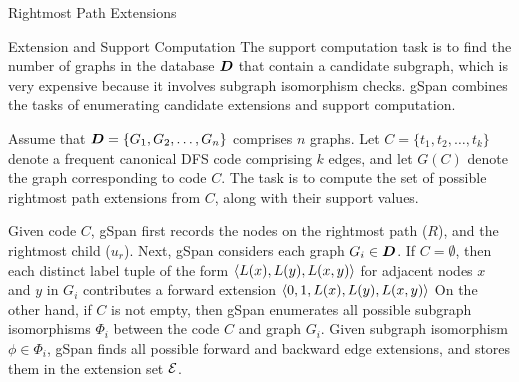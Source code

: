 \begin{frame}[fragile]{Rightmost Path Extensions}
\begin{figure}
  \centerline{
  }
\end{figure}
\end{frame}


\begin{frame}{Extension and Support Computation}
The support computation task is
to f\/{i}nd the number of graphs in the
database ${\boldsymbol D}$ that contain a candidate subgraph, which is very
expensive because it involves subgraph isomorphism checks.
gSpan combines the tasks of enumerating candidate extensions and support
computation.

\medskip
Assume that ${\boldsymbol D} = \{G_1, G_2, \ldots, G_n\}$ comprises $n$
graphs.  Let $C=\{t_1,t_2,\ldots,t_k\}$ denote a frequent
canonical DFS code comprising $k$ edges, and let $G(C)$ denote the
graph corresponding to code $C$.  The task is to compute the set
of possible rightmost path extensions from $C$, along with their
support values.

\medskip
Given code $C$, gSpan f\/{i}rst records the nodes on the rightmost path
($R$), and the rightmost child ($u_r$).  Next, gSpan considers each
graph $G_i \in {\boldsymbol D}$. If $C=\emptyset$, then each distinct label tuple of
the form $\langle L(x), L(y), L(x,y) \rangle$ for adjacent nodes $x$ and $y$ in
$G_i$ contributes a forward extension $\langle 0,1,L(x),L(y),L(x,y) \rangle$
On
the other hand, if $C$ is not empty, then gSpan enumerates all possible
subgraph isomorphisms $\Phi_i$ between the code $C$ and graph $G_i$. 
Given
subgraph
isomorphism $\phi \in \Phi_i$, gSpan f\/{i}nds all possible forward and
backward edge extensions, and stores them in the extension set ${\mathcal E}$.
\end{frame}

